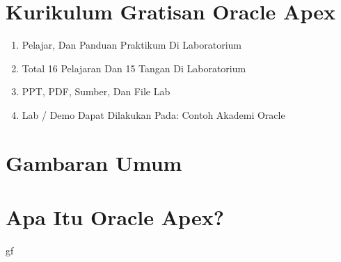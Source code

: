 \documentclass{article}
\begin{document}
\section {Kurikulum Gratisan Oracle Apex}
\begin{enumerate}
    \item Pelajar, Dan Panduan Praktikum Di Laboratorium
    \item Total 16 Pelajaran Dan 15 Tangan Di Laboratorium
    \item PPT, PDF, Sumber, Dan File Lab
    \item Lab / Demo Dapat Dilakukan Pada: Contoh Akademi Oracle

\end{enumerate}

\section {Gambaran Umum }
\usepackage {Lab Ini Menuntun Anda Saat Mengunggah Spreadsheet Ke Tabel Database Oracle, Lalu Membuat Aplikasi Berdasarkan Tabel Baru Ini.  Anda Kemudian Akan Bermain Dengan Laporan Interaktif Dan Meningkatkan Formulir Terlampir.  Terakhir, Anda Akan Menambahkan Halaman Kalender Dan Kemudian Menautkannya Ke Halaman Formulir Yang Ada.  Alih-Alih Mencoba Mengirim Surel Spreadsheet Untuk Mengumpulkan Informasi Dari Orang Yang Berbeda, Cukup Buat Aplikasi Dalam Hitungan Menit, Dan Kirim Surel URL.  Spreadsheet Sumber-Kebenaran-Tunggal, Multi-Pengguna, Aman, Dan Mudah Tersiram Ini!  Aplikasi Scren Jadi Lebih Baik}

\section{Apa Itu Oracle Apex?}

    \usepackage {Oracle Application Express (Oracle APEX) yang dulu disebut HTML-DB adalah sebuah framework yang berbasis pada sebuah database dedicated (sementara ini sampai versi terbaru masih dedicated untuk Oracle Db saja dan lisensi include dalam lisensi database), ini artinya apa bahwa engine aplikasi dibangun sepenuhnya didalam sebuah database. Bahkan untuk arsitektur Embedded PL/SQL Gateway seperti yang dipakai dalam Oracle XE dan Oracle 11G file image (library,css,theme,dll) disimpan didalam database metadata juga. Inilah hal yang berbeda dibandingkan framework yang lain.}gf
\end{document}
